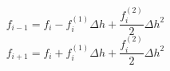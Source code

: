 \begin{equation} 
f_{{i-1}} = f_{i} - f^{{(1)}}_{i} {\Delta h} + \frac{f^{{(2)}}_{i}}{2} {\Delta h}^{2}
 \end{equation} 
\begin{equation} 
f_{{i+1}} = f_{i} + f^{{(1)}}_{i} {\Delta h} + \frac{f^{{(2)}}_{i}}{2} {\Delta h}^{2}
 \end{equation} 

